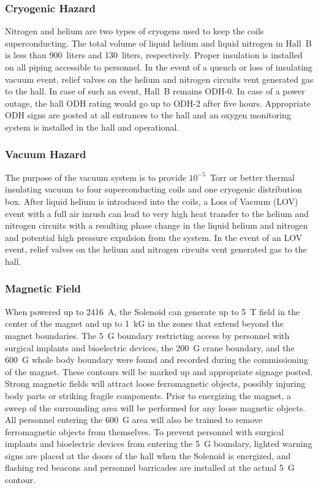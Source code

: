 \subsubsection{Cryogenic Hazard}

Nitrogen and helium are two types of cryogens used to keep the coils superconducting. The 
total volume of liquid helium and liquid nitrogen in Hall~B is less than 900~liters and 
130~liters, respectively. Proper insulation is installed on all piping accessible to 
personnel. In the event of a quench or loss of insulating vacuum event, relief valves on 
the helium and nitrogen circuits vent generated gas to the hall. In case of such an event, 
Hall~B remains ODH-0. In case of a power outage, the hall ODH rating would go up to ODH-2 
after five hours. Appropriate ODH signs are posted at all entrances to the hall and an 
oxygen monitoring system is installed in the hall and operational.

\subsubsection{Vacuum Hazard}

The purpose of the vacuum system is to provide $10^{-5}$~Torr or better thermal insulating 
vacuum to four superconducting coils and one cryogenic distribution box. After liquid helium 
is introduced into the coils, a Loss of Vacuum (LOV) event with a full air inrush can lead to
very high heat transfer to the helium and nitrogen circuits with a resulting phase change in 
the liquid helium and nitrogen and potential high pressure expulsion from the system. In the 
event of an LOV event, relief valves on the helium and nitrogen circuits vent generated
gas to the hall.

\subsubsection{Magnetic Field}

When powered up to 2416~A, the Solenoid can generate up to 5~T field in the center of the 
magnet and up to 1~kG in the zones that extend beyond the magnet boundaries. The 5~G 
boundary restricting access by personnel with surgical implants and bioelectric devices, 
the 200~G crane boundary, and the 600~G whole body boundary were found and recorded during 
the commissioning of the magnet. These contours will be marked up and appropriate signage 
posted. Strong magnetic fields will attract loose ferromagnetic objects, possibly injuring 
body parts or striking fragile components. Prior to energizing the magnet, a sweep of the
surrounding area will be performed for any loose magnetic objects. All personnel entering 
the 600~G area will also be trained to remove ferromagnetic objects from themselves. To 
prevent personnel with surgical implants and bioelectric devices from entering the 5~G
boundary, lighted warning signs are placed at the doors of the hall when the Solenoid is 
energized, and flashing red beacons and personnel barricades are installed at the actual 5~G 
contour.

